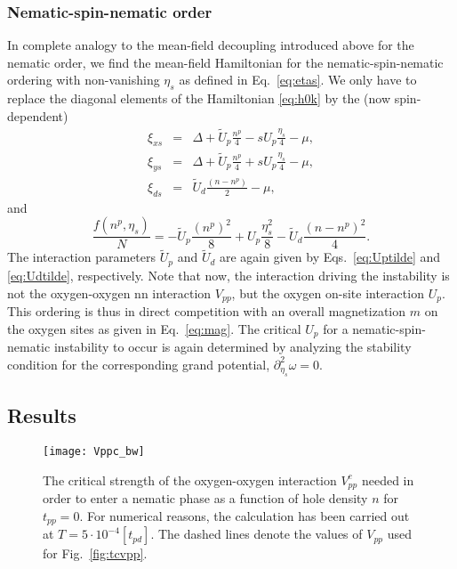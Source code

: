 \documentclass[prb, twocolumn,showpacs,preprintnumbers,amsmath,amssymb, floatfix]{revtex4}
\begin{document}
\subsubsection{Nematic-spin-nematic order}
In complete analogy to the mean-field decoupling introduced above for the nematic order, we find the mean-field Hamiltonian for the nematic-spin-nematic ordering with non-vanishing $\eta_s$ as defined in Eq.~\eqref{eq:etas}. We only have to replace the diagonal elements of the Hamiltonian \eqref{eq:h0k} by the (now spin-dependent)
\begin{eqnarray}
  \xi_{xs} &=& \Delta + \tilde{U}_{p} \frac{n^{p}}{4} - s U_{p}\frac{\eta_s}{4} - \mu,\\
  \xi_{ys} &=& \Delta + \tilde{U}_{p} \frac{n^{p}}{4} + s U_{p}\frac{\eta_s}{4} - \mu,\\
  \xi_{ds} &=& \tilde{U}_{d} \frac{(n-n^p)}{2} - \mu,
  \label{eqn:diagnsn}
\end{eqnarray}
and
\begin{equation}
  \frac{f(n^{p}, \eta_s)}{N} = -\tilde{U}_{p} \frac{(n^{p})^2}{8} + U_{p}\frac{\eta_s^{2}}{8} - \tilde{U}_{d}\frac{(n-n^{p})^2}{4}.
  \label{eq:fnsn}
\end{equation}
The interaction parameters $\tilde{U}_p$ and $\tilde{U}_{d}$ are again given by Eqs.~\eqref{eq:Uptilde} and \eqref{eq:Udtilde}, respectively.
Note that now, the interaction driving the instability is not the
oxygen-oxygen nn interaction $V_{pp}$, but the oxygen on-site
interaction $U_p$. This ordering is thus in direct competition with an overall magnetization $m$ on the oxygen sites as given in Eq.~\eqref{eq:mag}. The critical $U_p$ for a nematic-spin-nematic  instability to occur is again determined by analyzing the stability condition for the corresponding grand potential, $\partial^2_{\eta_s} \omega = 0$.

\subsection{Results}
\label{subsec:results}
\begin{figure}[tb]
  \begin{center}
    \texttt{[image: Vppc\_bw]}
  \end{center}
  \caption{The critical strength of the oxygen-oxygen interaction
    $V_{pp}^c$ needed in order to enter a nematic phase as a function
    of hole density $n$ for $t_{pp}=0$. For numerical reasons, the
    calculation has been carried out at $T=5\cdot10^{-4}[t_{pd}]$. The
    dashed lines denote the values of $V_{pp}$ used for
    Fig.~\ref{fig:tcvpp}.}
  \label{fig:vppc}
\end{figure}
\end{document}
